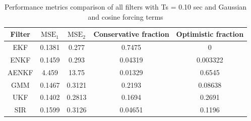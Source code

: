 \documentclass[]{article}
\begin{document}
\begin{table}[h!]
\centering
\begin{tabular}{|c|c|c|c|c|}
\hline
Filter & $\mathrm{MSE}_1$ & $\mathrm{MSE}_2$ & Conservative fraction & Optimistic fraction \\
\hline
EKF &   0.1381 &    0.277 &   0.7475 &        0 \\
\hline
ENKF &   0.1459 &    0.293 &  0.04319 & 0.003322 \\
\hline
AENKF &    4.459 &    13.75 &  0.01329 &   0.6545 \\
\hline
GMM &   0.1467 &   0.3121 &   0.2193 &  0.08638 \\
\hline
UKF &   0.1402 &   0.2813 &   0.1694 &   0.2691 \\
\hline
SIR &   0.1599 &   0.3126 &  0.04651 &   0.1196 \\
\hline
\end{tabular}
\caption{Performance metrics comparison of all filters with Ts = 0.10 sec and Gaussian and cosine forcing terms}
\label{table:compare_case_3_sample_0}
\end{table}
\end{document}
